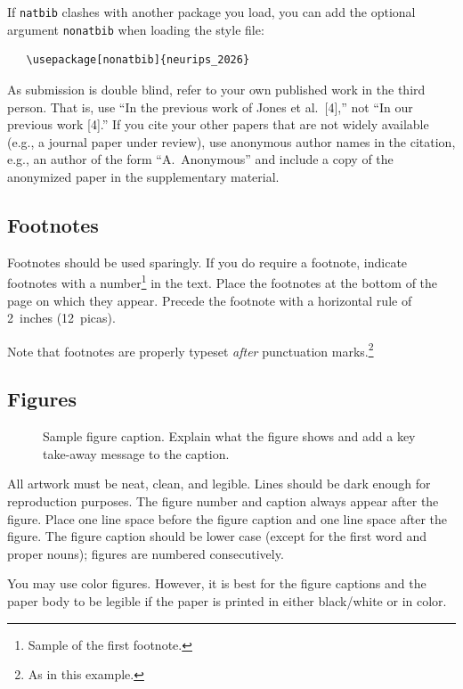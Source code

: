 \documentclass{article}
\begin{document}
If \verb+natbib+ clashes with another package you load, you can add the optional
argument \verb+nonatbib+ when loading the style file:
\begin{verbatim}
   \usepackage[nonatbib]{neurips_2026}
\end{verbatim}


As submission is double blind, refer to your own published work in the third
person. That is, use ``In the previous work of Jones et al.\ [4],'' not ``In our
previous work [4].'' If you cite your other papers that are not widely available
(e.g., a journal paper under review), use anonymous author names in the
citation, e.g., an author of the form ``A.\ Anonymous'' and include a copy of the anonymized paper in the supplementary material.


\subsection{Footnotes}


Footnotes should be used sparingly.  If you do require a footnote, indicate
footnotes with a number\footnote{Sample of the first footnote.} in the
text. Place the footnotes at the bottom of the page on which they appear.
Precede the footnote with a horizontal rule of 2~inches (12~picas).


Note that footnotes are properly typeset \emph{after} punctuation
marks.\footnote{As in this example.}


\subsection{Figures}


\begin{figure}
  \centering
  \fbox{\rule[-.5cm]{0cm}{4cm} \rule[-.5cm]{4cm}{0cm}}
  \caption{Sample figure caption. Explain what the figure shows and add a key take-away message to the caption.}
\end{figure}


All artwork must be neat, clean, and legible. Lines should be dark enough for
 reproduction purposes. The figure number and caption always appear after the
figure. Place one line space before the figure caption and one line space after
the figure. The figure caption should be lower case (except for the first word and proper nouns); figures are numbered consecutively.


You may use color figures.  However, it is best for the figure captions and the
paper body to be legible if the paper is printed in either black/white or in
color.
\end{document}
